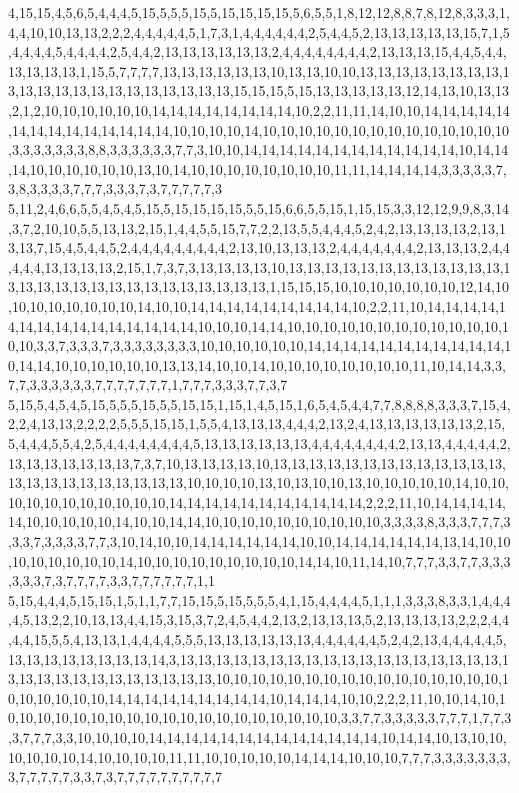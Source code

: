 4,15,15,4,5,6,5,4,4,4,5,15,5,5,5,15,5,15,15,15,15,5,6,5,5,1,8,12,12,8,8,7,8,12,8,3,3,3,1,4,4,10,10,13,13,2,2,2,4,4,4,4,4,5,1,7,3,1,4,4,4,4,4,4,2,5,4,4,5,2,13,13,13,13,13,15,7,1,5,4,4,4,4,5,4,4,4,4,2,5,4,4,2,13,13,13,13,13,13,2,4,4,4,4,4,4,4,4,2,13,13,13,15,4,4,5,4,4,13,13,13,13,1,15,5,7,7,7,7,13,13,13,13,13,13,10,13,13,10,10,13,13,13,13,13,13,13,13,13,13,13,13,13,13,13,13,13,13,13,13,13,15,15,15,5,15,13,13,13,13,13,12,14,13,10,13,13,2,1,2,10,10,10,10,10,10,14,14,14,14,14,14,14,14,10,2,2,11,11,14,10,10,14,14,14,14,14,14,14,14,14,14,14,14,14,14,10,10,10,10,14,10,10,10,10,10,10,10,10,10,10,10,10,10,10,3,3,3,3,3,3,3,8,8,3,3,3,3,3,3,7,7,3,10,10,14,14,14,14,14,14,14,14,14,14,14,14,10,14,14,14,10,10,10,10,10,10,13,10,14,10,10,10,10,10,10,10,10,11,11,14,14,14,14,3,3,3,3,3,7,3,8,3,3,3,3,7,7,7,3,3,3,7,3,7,7,7,7,7,3
5,11,2,4,6,6,5,5,4,5,4,5,15,5,15,15,15,15,5,5,15,6,6,5,5,15,1,15,15,3,3,12,12,9,9,8,3,14,3,7,2,10,10,5,5,13,13,2,15,1,4,4,5,5,15,7,7,2,2,13,5,5,4,4,4,5,2,4,2,13,13,13,13,2,13,13,13,7,15,4,5,4,4,5,2,4,4,4,4,4,4,4,4,4,2,13,10,13,13,13,2,4,4,4,4,4,4,4,2,13,13,13,2,4,4,4,4,4,13,13,13,13,2,15,1,7,3,7,3,13,13,13,13,10,13,13,13,13,13,13,13,13,13,13,13,13,13,13,13,13,13,13,13,13,13,13,13,13,13,13,13,1,15,15,15,10,10,10,10,10,10,10,12,14,10,10,10,10,10,10,10,10,14,10,10,14,14,14,14,14,14,14,14,14,10,2,2,11,10,14,14,14,14,14,14,14,14,14,14,14,14,14,14,14,10,10,10,14,14,10,10,10,10,10,10,10,10,10,10,10,10,10,10,3,3,7,3,3,3,7,3,3,3,3,3,3,3,3,10,10,10,10,10,10,14,14,14,14,14,14,14,14,14,14,14,10,14,14,10,10,10,10,10,10,13,13,14,10,10,14,10,10,10,10,10,10,10,10,11,10,14,14,3,3,7,7,3,3,3,3,3,3,7,7,7,7,7,7,7,1,7,7,7,3,3,3,7,7,3,7
5,15,5,4,5,4,5,15,5,5,5,15,5,5,15,15,1,15,1,4,5,15,1,6,5,4,5,4,4,7,7,8,8,8,8,3,3,3,7,15,4,2,2,4,13,13,2,2,2,2,5,5,5,15,15,1,5,5,4,13,13,13,4,4,4,2,13,2,4,13,13,13,13,13,13,2,15,5,4,4,4,5,5,4,2,5,4,4,4,4,4,4,4,4,5,13,13,13,13,13,13,4,4,4,4,4,4,4,4,2,13,13,4,4,4,4,4,2,13,13,13,13,13,13,13,7,3,7,10,13,13,13,13,10,13,13,13,13,13,13,13,13,13,13,13,13,13,13,13,13,13,13,13,13,13,13,13,10,10,10,10,13,10,13,10,10,13,10,10,10,10,10,14,10,10,10,10,10,10,10,10,10,10,10,14,14,14,14,14,14,14,14,14,14,14,2,2,2,11,10,14,14,14,14,14,10,10,10,10,10,14,10,10,14,14,10,10,10,10,10,10,10,10,10,10,3,3,3,3,8,3,3,3,7,7,7,3,3,3,7,3,3,3,3,7,7,3,10,14,10,10,14,14,14,14,14,14,10,10,14,14,14,14,14,14,13,14,10,10,10,10,10,10,10,10,14,10,10,10,10,10,10,10,10,10,14,14,10,11,14,10,7,7,7,3,3,7,7,3,3,3,3,3,3,7,3,7,7,7,7,3,3,7,7,7,7,7,7,1,1
5,15,4,4,4,5,15,15,1,5,1,1,7,7,15,15,5,15,5,5,5,4,1,15,4,4,4,4,5,1,1,1,3,3,3,8,3,3,1,4,4,4,4,5,13,2,2,10,13,13,4,4,15,3,15,3,7,2,4,5,4,4,2,13,2,13,13,13,5,2,13,13,13,13,2,2,2,4,4,4,4,15,5,5,4,13,13,1,4,4,4,4,5,5,5,13,13,13,13,13,13,4,4,4,4,4,4,5,2,4,2,13,4,4,4,4,4,5,13,13,13,13,13,13,13,13,14,3,13,13,13,13,13,13,13,13,13,13,13,13,13,13,13,13,13,13,13,13,13,13,13,13,13,13,13,13,13,13,10,10,10,10,10,10,10,10,10,10,10,10,10,10,10,10,10,10,10,10,10,10,14,14,14,14,14,14,14,14,14,10,14,14,14,10,10,2,2,2,11,10,10,14,10,10,10,10,10,10,10,10,10,10,10,10,10,10,10,10,10,10,10,10,3,3,7,7,3,3,3,3,3,7,7,7,1,7,7,3,3,7,7,7,3,3,10,10,10,10,14,14,14,14,14,14,14,14,14,14,14,14,14,10,14,14,10,13,10,10,10,10,10,10,14,10,10,10,10,11,11,10,10,10,10,10,14,14,14,10,10,10,7,7,7,3,3,3,3,3,3,3,3,7,7,7,7,7,3,3,7,3,7,7,7,7,7,7,7,7,7,7
